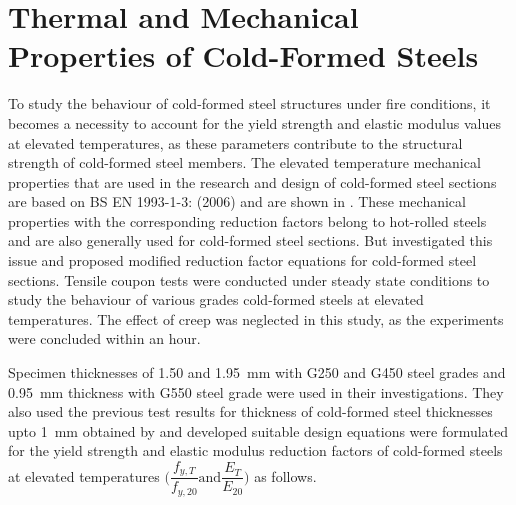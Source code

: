 \section{Thermal and Mechanical Properties of Cold-Formed Steels}

To study the behaviour of cold-formed steel structures under fire conditions, it becomes a necessity to account for the yield strength and elastic modulus values at elevated temperatures, as these parameters contribute to the structural strength of cold-formed steel members. The elevated temperature mechanical properties that are used in the research and design of cold-formed steel sections are based on BS EN 1993-1-3: (2006) and are shown in . These mechanical properties with the corresponding reduction factors belong to hot-rolled steels and are also generally used for cold-formed steel sections. But \citet{Kankanamge2011} investigated this issue and proposed modified reduction factor equations for cold-formed steel sections. Tensile coupon tests were conducted under steady state conditions to study the behaviour of various grades cold-formed steels at elevated temperatures. The effect of creep was neglected in this study, as the experiments were concluded within an hour.

Specimen thicknesses of 1.50 and 1.95~mm with G250 and G450 steel grades and 0.95~mm thickness with G550 steel grade were used in their investigations. They also used the previous test results for thickness of cold-formed steel thicknesses upto 1~mm obtained by \citet{Ranawaka2009a} and developed suitable design equations were formulated for the yield strength and elastic modulus reduction factors of cold-formed steels at elevated temperatures $\Big(\dfrac{f_{y,T}}{f_{y,20}} \text{and} \dfrac{E_T}{E_{20}} \Big)$ as follows.

